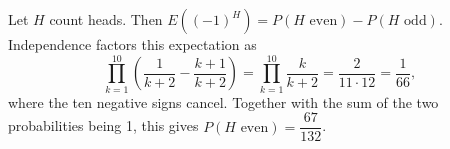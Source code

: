 Let $ H $ count heads. Then $ E((-1)^H)=P(H\text{ even})-P(H\text{ odd})$. Independence factors this expectation as \[\prod_{k=1}^{10}\left(\dfrac{1}{k+2}-\dfrac{k+1}{k+2}\right)=\prod_{k=1}^{10}\dfrac{k}{k+2}=\dfrac{2}{11\cdot12}=\dfrac{1}{66},\]where the ten negative signs cancel. Together with the sum of the two probabilities being 1, this gives $\boxed{P(H\text{ even})=\dfrac{67}{132}}$.
